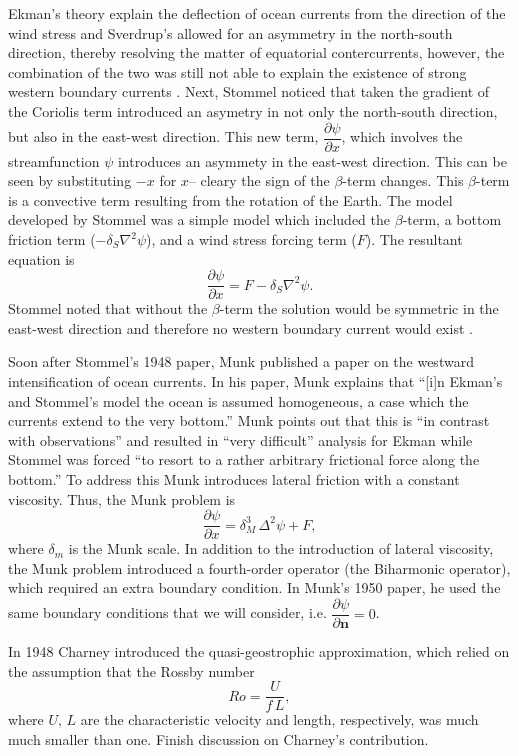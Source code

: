 Ekman's theory explain the deflection of ocean currents from the direction of
the wind stress and Sverdrup's allowed for an asymmetry in the north-south
direction, thereby resolving the matter of equatorial contercurrents, however,
the combination of the two was still not able to explain the existence of strong
western boundary currents \cite{Fox-Kemper2003}.  Next,
Stommel\cite{Stommel1948} noticed that taken the gradient of the Coriolis term
introduced an asymetry in not only the north-south direction, but also in the
east-west direction. This new term, $\dfrac{\partial \psi}{\partial x}$, which
involves the streamfunction $\psi$ introduces an asymmety in the east-west
direction. This can be seen by substituting $-x$ for $x$-- cleary the sign of
the $\beta$-term changes. This $\beta$-term is a convective term resulting from
the rotation of the Earth. The model developed by Stommel was a simple model
which included the $\beta$-term, a bottom friction term ($-\delta_S \nabla^2
\psi$), and a wind stress forcing term ($F$).  The resultant equation
is \cite{Fox-Kemper2003,Stommel1948,Vallis06}
\begin{equation} \frac{\partial
  \psi}{\partial x} = F - \delta_S \nabla^2 \psi.
  \label{eqn:StommelModel}
\end{equation}
Stommel noted that without the $\beta$-term the solution would be
symmetric in the east-west direction and therefore no western boundary current
would exist \cite{Stommel1948}.

Soon after Stommel's 1948 paper, Munk\cite{Munk1950} published a paper on the
westward intensification of ocean currents. In his paper, Munk explains that
``[i]n Ekman's and Stommel's model the ocean is assumed homogeneous, a case
which the currents extend to the very bottom.'' Munk points out that this is
``in contrast with observations'' and resulted in ``very difficult'' analysis
for Ekman while Stommel was forced ``to resort to a rather arbitrary frictional
force along the bottom.'' To address this Munk introduces lateral friction with
a constant viscosity. Thus, the Munk problem is
\cite{Fox-Kemper2003,Munk1950,Vallis06}
\begin{equation}
  \frac{\partial \psi}{\partial x} = \delta_M^3\, \Delta^2 \psi + F,
  \label{eqn:MunkProblem}
\end{equation}
where $\delta_m$ is the Munk scale. In addition to the introduction of lateral
viscosity, the Munk problem introduced a fourth-order operator (the Biharmonic
operator), which required an extra boundary condition.  In Munk's 1950
paper\cite{Munk1950}, he used the same boundary conditions that we will
consider, i.e. $\dfrac{\partial \psi}{\partial \mathbf{n}} = 0$.

In 1948 Charney\cite{Charney1948} introduced the quasi-geostrophic
approximation, which relied on the assumption that the Rossby number
\begin{equation}
  Ro = \frac{U}{f\, L},
  \label{eqn:RossbyNumber}
\end{equation}
where $U,\, L$ are the characteristic velocity and length, respectively, was
much much smaller than one.
{\color{red} Finish discussion on Charney's contribution.}
